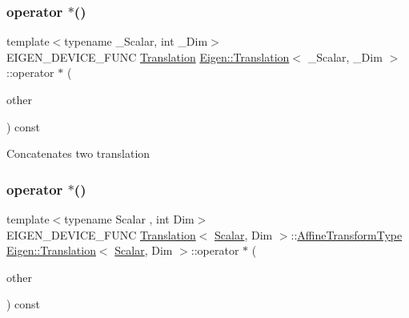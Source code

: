 \subsubsection{\texorpdfstring{operator $\ast$()}{operator *()}\hspace{0.1cm}{\footnotesize\ttfamily [1/6]}}
{\footnotesize\ttfamily template$<$typename \+\_\+\+Scalar, int \+\_\+\+Dim$>$ \\
E\+I\+G\+E\+N\+\_\+\+D\+E\+V\+I\+C\+E\+\_\+\+F\+U\+NC \mbox{\hyperlink{class_eigen_1_1_translation}{Translation}} \mbox{\hyperlink{class_eigen_1_1_translation}{Eigen\+::\+Translation}}$<$ \+\_\+\+Scalar, \+\_\+\+Dim $>$\+::operator $\ast$ (\begin{DoxyParamCaption}\item[{const \mbox{\hyperlink{class_eigen_1_1_translation}{Translation}}$<$ \+\_\+\+Scalar, \+\_\+\+Dim $>$ \&}]{other }\end{DoxyParamCaption}) const\hspace{0.3cm}{\ttfamily [inline]}}

Concatenates two translation \mbox{\label{class_eigen_1_1_translation_a64d809cd1bee92a0f86f0900e5b99783}} 
\subsubsection{\texorpdfstring{operator $\ast$()}{operator *()}\hspace{0.1cm}{\footnotesize\ttfamily [2/6]}}
{\footnotesize\ttfamily template$<$typename Scalar , int Dim$>$ \\
E\+I\+G\+E\+N\+\_\+\+D\+E\+V\+I\+C\+E\+\_\+\+F\+U\+NC \mbox{\hyperlink{class_eigen_1_1_translation}{Translation}}$<$ \mbox{\hyperlink{class_eigen_1_1_translation_ad596bf21ced4b902cc242205df486e21}{Scalar}}, Dim $>$\+::\mbox{\hyperlink{class_eigen_1_1_translation_a25c762409320ba9490a0d12c6652bbad}{Affine\+Transform\+Type}} \mbox{\hyperlink{class_eigen_1_1_translation}{Eigen\+::\+Translation}}$<$ \mbox{\hyperlink{class_eigen_1_1_translation_ad596bf21ced4b902cc242205df486e21}{Scalar}}, Dim $>$\+::operator $\ast$ (\begin{DoxyParamCaption}\item[{const \mbox{\hyperlink{class_eigen_1_1_uniform_scaling}{Uniform\+Scaling}}$<$ \mbox{\hyperlink{class_eigen_1_1_translation_ad596bf21ced4b902cc242205df486e21}{Scalar}} $>$ \&}]{other }\end{DoxyParamCaption}) const\hspace{0.3cm}{\ttfamily [inline]}}

